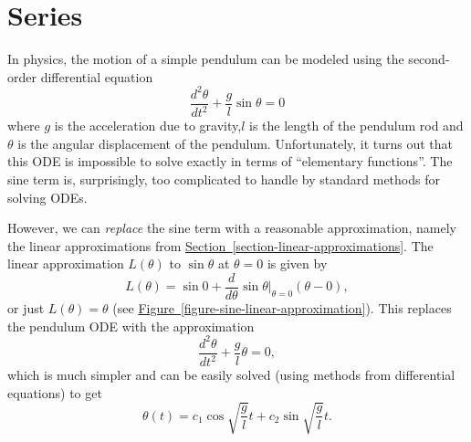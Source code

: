 \documentclass[10pt,]{book}
\numberwithin{equation}{section}
\newcommand{\dv}[3][]{\dfrac{d^{#1} #2}{d #3^{#1}}}
\begin{document}
\chapter[{Series}]{Series}\label{series}
\begin{introduction}{}%
\hypertarget{p-777}{}%
In physics, the motion of a simple pendulum can be modeled using the second-order differential equation%
\begin{equation*}
\dv[2]{\theta}{t} + \frac{g}{l}\sin\theta = 0
\end{equation*}
where \(g\) is the acceleration due to gravity,\(l\) is the length of the pendulum rod and \(\theta\) is the angular displacement of the pendulum. Unfortunately, it turns out that this ODE is impossible to solve exactly in terms of ``elementary functions''. The sine term is, surprisingly, too complicated to handle by standard methods for solving ODEs.%
\par
\hypertarget{p-778}{}%
However, we can \emph{replace} the sine term with a reasonable approximation, namely the linear approximations from \hyperref[section-linear-approximations]{Section~\ref{section-linear-approximations}}. The linear approximation \(L(\theta)\) to \(\sin\theta\) at \(\theta = 0\) is given by%
\begin{equation*}
L(\theta) = \sin0 + \dv{}{\theta}\sin\theta\Big|_{\theta= 0}(\theta - 0),
\end{equation*}
or just \(L(\theta) = \theta\) (see \hyperref[figure-sine-linear-approximation]{Figure~\ref{figure-sine-linear-approximation}}). This replaces the pendulum ODE with the approximation%
\begin{equation*}
\dv[2]{\theta}{t} + \frac{g}{l}\theta = 0,
\end{equation*}
which is much simpler and can be easily solved (using methods from differential equations) to get%
\begin{equation*}
\theta(t) = c_{1}\cos\sqrt{\frac{g}{l}}t + c_{2}\sin\sqrt{\frac{g}{l}}t.
\end{equation*}
%
\begin{figure}
\centering
{
}
\end{figure}
\end{introduction}
\end{document}
